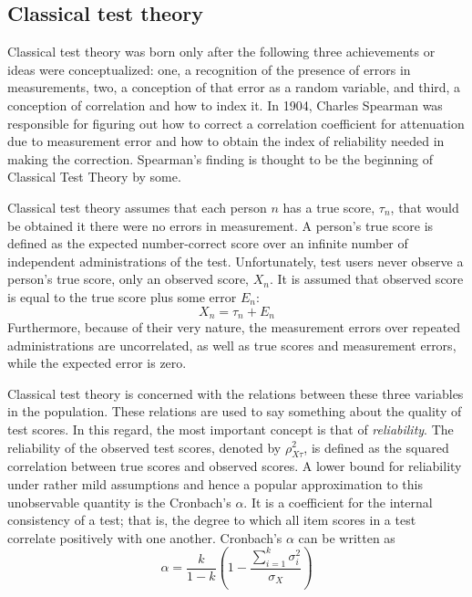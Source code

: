 \subsection{Classical test theory}
\par Classical test theory was born only after the following three achievements or ideas were conceptualized: one, a recognition of the presence of errors in measurements, two, a conception of that error as a random variable, and third, a conception of correlation and how to index it. In 1904, Charles Spearman was responsible for figuring out how to correct a correlation coefficient for attenuation due to measurement error and how to obtain the index of reliability needed in making the correction.\cite{Traub97} Spearman's finding is thought to be the beginning of Classical Test Theory by some.\\
\par Classical test theory assumes that each person $n$ has a true score, $\tau_n$, that would be obtained it there were no errors in measurement. A person's true score is defined as the expected number-correct score over an infinite number of independent administrations of the test. Unfortunately, test users never observe a person's true score, only an observed score, $X_n$. It is assumed that observed score is equal to the true score plus some error $E_n$:
\begin{equation}
X_n = \tau_n+E_n
\end{equation}
Furthermore, because of their very nature, the measurement errors over repeated administrations are uncorrelated, as well as true scores and measurement errors, while the expected error is zero. 
\par Classical test theory is concerned with the relations between these three variables in the population. These relations are used to say something about the quality of test scores. In this regard, the most important concept is that of \emph{reliability}. 
The reliability of the observed test scores, denoted by $\rho^2_{X\tau}$, is defined as the squared correlation between true scores and observed scores. A lower bound for reliability under rather mild assumptions and hence a popular approximation to
this unobservable quantity is the Cronbach's $\alpha$. It is a coefficient for the internal consistency of a test; that is, the degree to which all item scores in a test correlate positively with one another. Cronbach's $\alpha$ can be written as
\begin{equation}
\alpha= \frac{k}{1-k}\left(1- \frac{\sum_{i=1}^{k}\sigma^2_i}{\sigma_X} \right)
\end{equation}
